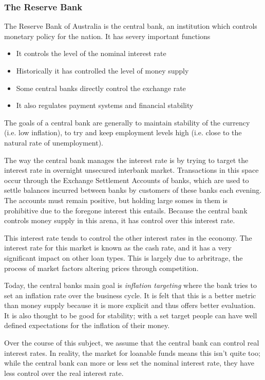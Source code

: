 \documentclass[12pt]{report}
\begin{document}
\begin{flushleft}
\subsubsection*{The Reserve Bank}

The Reserve Bank of Australia is the central bank, an institution which
controls monetary policy for the nation. It has severy important functions
\begin{itemize}
    \item It controls the level of the nominal interest rate
    \item Historically it has controlled the level of money supply
    \item Some central banks directly control the exchange rate
    \item It also regulates payment systems and financial stability
\end{itemize}
The goals of a central bank are generally to maintain stability of the currency
(i.e. low inflation), to try and keep employment levels high (i.e. close to the
natural rate of unemployment). \par
The way the central bank manages the interest rate is by trying to target the
interest rate in overnight unsecured interbank market. Transactions in this
space occur through the Exchange Settlement Accounts of banks, which are used
to settle balances incurred between banks by customers of these banks each
evening. The accounts must remain positive, but holding large somes in them is
prohibitive due to the foregone interest this entails. Because the central bank
controls money supply in this arena, it has control over this interest rate.
\par
This interest rate tends to control the other interest rates in the economy.
The interest rate for this market is known as the cash rate, and it has a very
significant impact on other loan types. This is largely due to arbritrage, the
process of market factors altering prices through competition. \par
Today, the central banks main goal is \textit{inflation targeting} where the
bank tries to set an inflation rate over the business cycle. It is felt that
this is a better metric than money supply because it is more explicit and thus
offers better evaluation. It is also thought to be good for stability; with a
set target people can have well defined expectations for the inflation of their
money. \par
Over the course of this subject, we assume that the central bank can control
real interest rates. In reality, the market for loanable funds means this isn't
quite too; while the central bank can more or less set the nominal interest
rate, they have less control over the real interest rate.


\end{flushleft}
\end{document}
